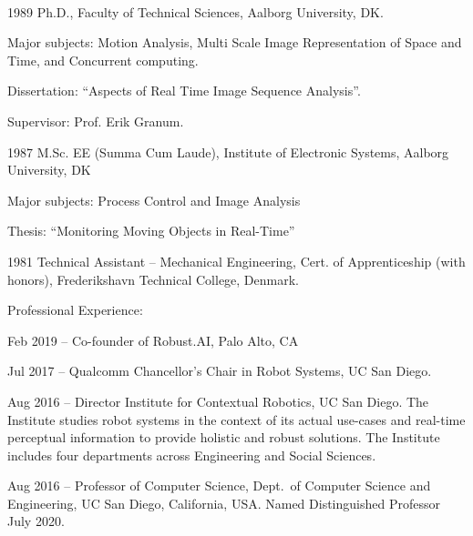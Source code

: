 \documentclass{article}
\newenvironment{sublist}{%
  \begin{list}{}{%
      \setlength{\itemsep}{0em}\setlength{\parsep}{0em}%
      \setlength{\topsep}{0em}\setlength{\parskip}{0em}%
    }%
}%
{ \end{list} }
\begin{document}
\begin{cv}
  \begin{cvlist}{~}
  \item[1989] Ph.D., Faculty of Technical Sciences, Aalborg
    University, DK.
    \begin{sublist}
    \item Major subjects: Motion Analysis, Multi Scale Image
      Representation of Space and Time, and Concurrent computing.
    \item Dissertation: ``Aspects of Real Time Image Sequence
      Analysis''.
    \item Supervisor: Prof. Erik Granum.
    \end{sublist}
  \item[1987] M.Sc. EE (Summa Cum Laude), Institute of Electronic
    Systems, Aalborg University, DK
    \begin{sublist}
    \item Major subjects: Process Control and Image Analysis
    \item Thesis: ``Monitoring Moving Objects in Real-Time''
    \end{sublist}
  \item[1981] Technical Assistant -- Mechanical Engineering, Cert.
    of Apprenticeship (with honors), Frederikshavn Technical
    College, Denmark.
\end{cvlist}



\begin{cvlist}{Professional Experience:}

\item[Feb 2019 --] Co-founder of Robust.AI, Palo Alto, CA 

\item[Jul 2017 --] Qualcomm Chancellor's Chair in Robot Systems, UC San Diego.

\item[Aug 2016 --] Director Institute for Contextual Robotics, UC San
  Diego. The Institute studies robot systems in the context of its
  actual use-cases and real-time perceptual information to provide
  holistic and robust solutions. The Institute includes four
  departments across Engineering and Social Sciences.

\item[Aug 2016 --] Professor of Computer Science, Dept.\ of Computer
  Science and Engineering, UC San Diego, California, USA. Named
  Distinguished Professor July 2020.


\end{cvlist}
\end{cv}
\end{document}
